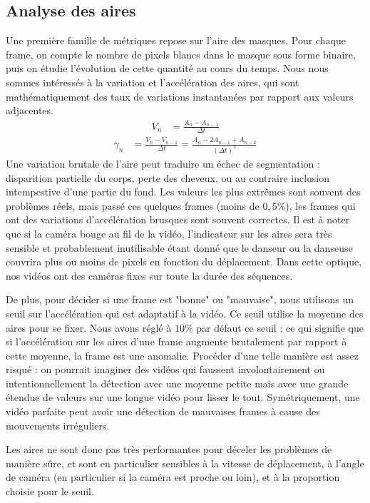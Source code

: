 \documentclass[11pt,a4paper]{article}
\begin{document}
\subsection{Analyse des aires}
Une première famille de métriques repose sur l'aire des masques.
Pour chaque frame, on compte le nombre de pixels blancs dans le masque sous forme binaire, puis on étudie l'évolution de cette quantité au cours du temps.
Nous nous sommes intéressés à la variation et l'accélération des aires, qui sont mathématiquement des taux de variations instantanées par rapport aux valeurs adjacentes.
\begin{align}
    V_n &= \frac{A_n - A_{n-1}}{\Delta t}
\end{align}
\begin{align}
    \gamma_n &= \frac{V_n - V_{n-1}}{\Delta t} = \frac{A_n - 2A_{n-1} + A_{n-2}}{(\Delta t)^2}
\end{align}
Une variation brutale de l'aire peut traduire un échec de segmentation : disparition partielle du corps, perte des cheveux, ou au contraire inclusion intempestive d'une partie du fond.
Les valeurs les plus extrêmes sont souvent des problèmes réels, mais passé ces quelques frames (moins de $0{,}5\%$), les frames qui ont des variations d'accélération brusques sont souvent correctes.
Il est à noter que si la caméra bouge au fil de la vidéo, l'indicateur sur les aires sera très sensible et probablement inutilisable étant donné que le danseur ou la danseuse couvrira plus ou moins de pixels en fonction du déplacement. Dans cette optique, nos vidéos ont des caméras fixes sur toute la durée des séquences.

De plus, pour décider si une frame est "bonne" ou "mauvaise", nous utilisons un seuil sur l'accélération qui est adaptatif à la vidéo. Ce seuil utilise la moyenne des aires pour se fixer.
Nous avons réglé à $10\%$ par défaut ce seuil : ce qui signifie que si l'accélération sur les aires d'une frame augmente brutalement par rapport à cette moyenne, la frame est une anomalie.
Procéder d'une telle manière est assez risqué : on pourrait imaginer des vidéos qui faussent involontairement ou intentionnellement la détection avec une moyenne petite mais avec une grande étendue de valeurs sur une longue vidéo pour lisser le tout.
Symétriquement, une vidéo parfaite peut avoir une détection de mauvaises frames à cause des mouvements irréguliers.

Les aires ne sont donc pas très performantes pour déceler les problèmes de manière sûre, et sont en particulier sensibles à la vitesse de déplacement, à l'angle de caméra (en particulier si la caméra est proche ou loin), et à la proportion choisie pour le seuil.
\end{document}
